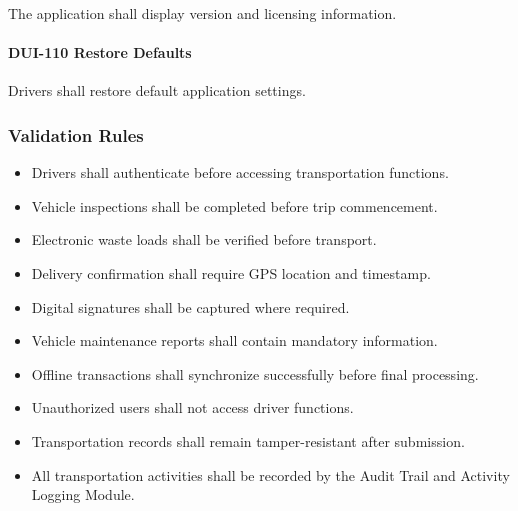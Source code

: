 The application shall display version and licensing information.

\paragraph{DUI-110 Restore Defaults}

Drivers shall restore default application settings.


\subsubsection*{Validation Rules}

\begin{itemize}

\item Drivers shall authenticate before accessing transportation
functions.

\item Vehicle inspections shall be completed before trip commencement.

\item Electronic waste loads shall be verified before transport.

\item Delivery confirmation shall require GPS location and timestamp.

\item Digital signatures shall be captured where required.

\item Vehicle maintenance reports shall contain mandatory information.

\item Offline transactions shall synchronize successfully before final
processing.

\item Unauthorized users shall not access driver functions.

\item Transportation records shall remain tamper-resistant after
submission.

\item All transportation activities shall be recorded by the Audit Trail
and Activity Logging Module.

\end{itemize}


